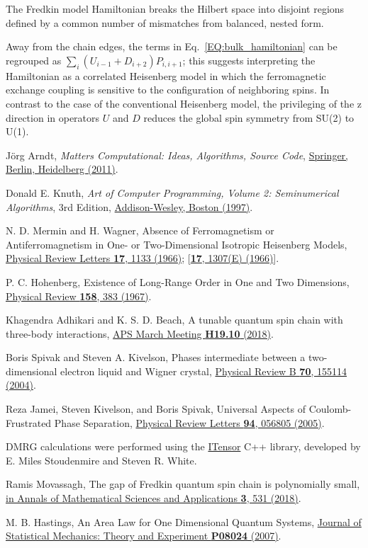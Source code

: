 \documentclass[aps,pra,twocolumn,groupaddress,showpacs]{revtex4-1}
\newcommand{\linkdoi}[2]{\href{http://dx.doi.org/#2}{#1}}
\newcommand{\linkisbn}[2]{\href{https://isbndb.com/book/#2}{#1}}
\newcommand{\linkapsmeeting}[2]{\href{http://meetings.aps.org/Meeting/#2}
{#1}}
\newcommand{\linkhttp}[2]{\href{http://#2}{#1}}
\begin{document}
\begin{thebibliography}{99}
The Fredkin model Hamiltonian breaks the Hilbert space into disjoint regions defined by a common number of mismatches from balanced, nested form.

Away from the chain edges, the terms in Eq.~\eqref{EQ:bulk_hamiltonian} can be
regrouped as $\sum_i(U_{i-1} + D_{i+2})P_{i,i+1}$; this suggests
interpreting the Hamiltonian as a correlated Heisenberg model in which the ferromagnetic exchange coupling is sensitive to the configuration of neighboring spins. In contrast to the case of the conventional Heisenberg model, the privileging of the z direction in operators $U$ and $D$ reduces the global spin symmetry from SU(2) to U(1).

J\"org Arndt, {\it Matters Computational: Ideas, Algorithms, Source Code},
\linkdoi{Springer, Berlin, Heidelberg (2011)}{10.1007/978-3-642-14764-7}.

Donald E. Knuth, {\it Art of Computer Programming, Volume 2: Seminumerical Algorithms}, 3rd Edition, \linkisbn{Addison-Wesley, Boston (1997)}{9780201896848}.

N. D. Mermin and H. Wagner,
Absence of Ferromagnetism or Antiferromagnetism in One- or Two-Dimensional Isotropic Heisenberg Models,
\linkdoi{Physical Review Letters {\bf 17}, 1133 (1966)}
{10.1103/PhysRevLett.17.1133}; [\linkdoi{{\bf 17}, 1307(E) (1966)}
{10.1103/PhysRevLett.17.1307}].

P. C. Hohenberg,
Existence of Long-Range Order in One and Two Dimensions,
\linkdoi{Physical Review {\bf 158}, 383 (1967)}
{10.1103/PhysRev.158.383}.

Khagendra Adhikari and K. S. D. Beach,
A tunable quantum spin chain with three-body interactions,
\linkapsmeeting{APS March Meeting {\bf H19.10} (2018)}
{MAR18/Session/H19.10}.

Boris Spivak and Steven A. Kivelson,
Phases intermediate between a two-dimensional electron liquid and Wigner crystal,
\linkdoi{Physical Review B {\bf 70}, 155114 (2004)}
{10.1103/PhysRevB.70.155114}.

Reza Jamei, Steven Kivelson, and Boris Spivak,
Universal Aspects of Coulomb-Frustrated Phase Separation,
\linkdoi{Physical Review Letters {\bf 94}, 056805 (2005)}
{10.1103/PhysRevLett.94.056805}.

DMRG calculations were performed using the \linkhttp{ITensor}{itensor.org} C++ library, developed by E. Miles Stoudenmire and Steven R. White.

Ramis Movassagh,
The gap of Fredkin quantum spin chain is polynomially small,
\linkdoi{in Annals of Mathematical Sciences and Applications {\bf 3}, 531 (2018)}
{10.4310/AMSA.2018.v3.n2.a5}.

M. B. Hastings,
An Area Law for One Dimensional Quantum Systems,
\linkdoi{Journal of Statistical Mechanics: Theory and Experiment {\bf P08024} (2007)}
{10.1088/1742-5468/2007/08/P08024}.

\end{thebibliography}
\end{document}
